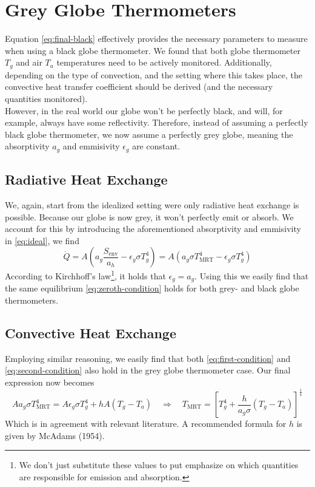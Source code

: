 \documentclass[]{scrartcl}
\begin{document}
\section{Grey Globe Thermometers}
Equation \eqref{eq:final-black} effectively provides the necessary parameters to measure when using a black globe thermometer. We found that both globe thermometer $T_g$ and air $T_a$ temperatures need to be actively monitored. Additionally, depending on the type of convection, and the setting where this takes place, the convective heat transfer coefficient should be derived (and the necessary quantities monitored).
\\

However, in the real world our globe won't be perfectly black, and will, for example, always have some reflectivity. Therefore, instead of assuming a perfectly black globe thermometer, we now assume a perfectly grey globe, meaning the absorptivity $a_{g}$ and emmisivity $\epsilon_g$ are constant.

\subsection{Radiative Heat Exchange}
We, again, start from the idealized setting were only radiative heat exchange is possible. Because our globe is now grey, it won't perfectly emit or absorb. We account for this by introducing the aforementioned absorptivity and emmisivity in \eqref{eq:ideal}, we find
\begin{equation}\label{eq:ideal-grey}
	\boxed{\dot{Q} = A\left(a_g\frac{S_{\text{env}}}{a_{h}} - \epsilon_g\sigma T^4_g\right) = A\left(a_g\sigma T^4_{\text{MRT}} - \epsilon_g\sigma T^4_g\right)}
\end{equation}
According to Kirchhoff's law\footnote{We don't just substitute these values to put emphasize on which quantities are responsible for emission and absorption.}, it holds that $\epsilon_{g} = a_{g}$. Using this we easily find that the same equilibrium \eqref{eq:zeroth-condition} holds for both grey- and black globe thermometers.

\subsection{Convective Heat Exchange}
Employing similar reasoning, we easily find that both \eqref{eq:first-condition} and \eqref{eq:second-condition} also hold in the grey globe thermometer case. Our final expression now becomes
\begin{equation}
	\boxed{Aa_g\sigma T^4_{\text{MRT}} = A\epsilon_g\sigma T^4_g + hA\left(T_g - T_a\right) \quad \Longrightarrow \quad T_{\text{MRT}} = \left[T_g^4 + \frac{h}{a_g\sigma}\left(T_g - T_a\right)\right]^{\frac{1}{4}}}
\end{equation}
Which is in agreement with relevant literature. A recommended formula for $h$ is given by McAdams (1954).
\end{document}
